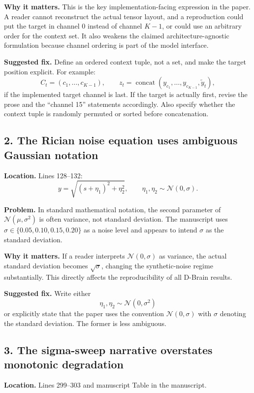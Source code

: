 \documentclass[11pt]{article}
\newcommand{\code}[1]{\texttt{\detokenize{#1}}}
\begin{document}
\textbf{Why it matters.} This is the key implementation-facing expression in the paper. A reader cannot reconstruct the actual tensor layout, and a reproduction could put the target in channel 0 instead of channel $K-1$, or could use an arbitrary order for the context set. It also weakens the claimed architecture-agnostic formulation because channel ordering is part of the model interface.

\textbf{Suggested fix.} Define an ordered context tuple, not a set, and make the target position explicit. For example:
\[
  C_t=(c_1,\ldots,c_{K-1}),\qquad
  z_t=\operatorname{concat}(y_{c_1},\ldots,y_{c_{K-1}},\tilde y_t),
\]
if the implemented target channel is last. If the target is actually first, revise the prose and the ``channel 15'' statements accordingly. Also specify whether the context tuple is randomly permuted or sorted before concatenation.

\subsection*{2. The Rician noise equation uses ambiguous Gaussian notation}

\textbf{Location.} Lines 128--132:
\[
  y = \sqrt{(s + \eta_1)^2 + \eta_2^2},
  \qquad \eta_1,\eta_2 \sim \mathcal{N}(0,\sigma).
\]

\textbf{Problem.} In standard mathematical notation, the second parameter of $\mathcal{N}(\mu,\sigma^2)$ is often variance, not standard deviation. The manuscript uses $\sigma\in\{0.05,0.10,0.15,0.20\}$ as a noise level and appears to intend $\sigma$ as the standard deviation.

\textbf{Why it matters.} If a reader interprets $\mathcal{N}(0,\sigma)$ as variance, the actual standard deviation becomes $\sqrt{\sigma}$, changing the synthetic-noise regime substantially. This directly affects the reproducibility of all D-Brain results.

\textbf{Suggested fix.} Write either
\[
  \eta_1,\eta_2 \sim \mathcal{N}(0,\sigma^2)
\]
or explicitly state that the paper uses the convention $\mathcal{N}(0,\sigma)$ with $\sigma$ denoting the standard deviation. The former is less ambiguous.

\subsection*{3. The sigma-sweep narrative overstates monotonic degradation}

\textbf{Location.} Lines 299--303 and manuscript Table \code{tab:sigma_sweep} in the manuscript.
\end{document}
